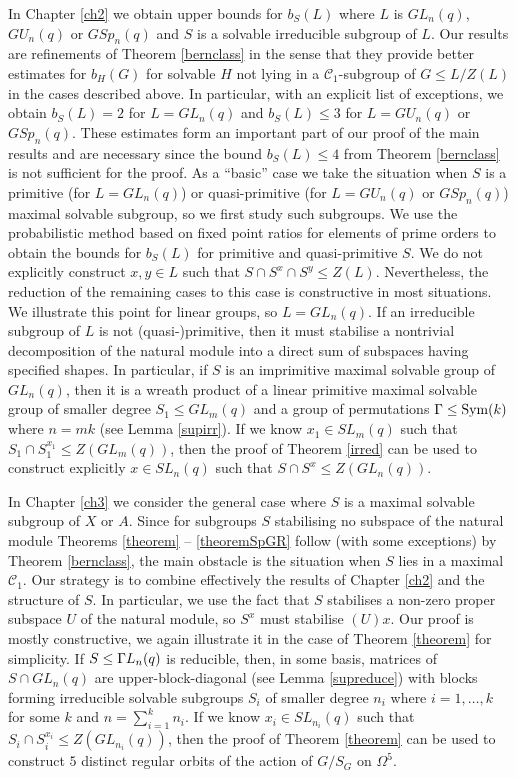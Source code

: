  In Chapter \ref{ch2} we obtain upper bounds for $b_S(L)$ where $L$ is $GL_n(q)$, $GU_n(q)$ or $GSp_n(q)$ and $S$ is a solvable irreducible subgroup of $L.$ Our results  are refinements of Theorem \ref{bernclass} in the sense that they provide better estimates for $b_H(G)$  for solvable $H$ not lying in a $\mathcal{C}_1$-subgroup of $G \le L/Z(L)$ in the cases described above. 
 In particular, with an explicit list of exceptions, we obtain $b_S(L) =2$ for $L=GL_n(q)$ and $b_S(L) \le 3$ for $L=GU_n(q)$ or $GSp_n(q).$  
 These estimates form an important part of our proof of the main results and are necessary since the bound $b_S(L) \le 4$  from Theorem \ref{bernclass} is not sufficient for the proof. As a ``basic'' case we take the situation when $S$ is a primitive (for $L=GL_n(q)$) or quasi-primitive (for $L=GU_n(q)$ or $GSp_n(q)$) maximal solvable subgroup, so we first study such subgroups. We use the probabilistic method based on fixed point ratios for elements of prime orders to obtain the bounds for $b_S(L)$  for primitive and quasi-primitive $S.$ We do not explicitly  construct  $x,y \in L$ such that $S \cap S^x \cap S^y \le Z(L).$ Nevertheless, the reduction of the remaining cases to this case is constructive in most situations. We illustrate this point for linear groups, so $L=GL_n(q).$ If an irreducible subgroup of $L$ is not (quasi-)primitive, then it must stabilise a nontrivial decomposition of the natural module into a direct sum of subspaces having specified shapes.   In particular, if $S$ is an imprimitive maximal solvable group of $GL_n(q)$, then it is a wreath product of a linear primitive maximal solvable group of smaller degree $S_1 \le GL_m(q)$ and a group of permutations $\Gamma \le \mathrm{Sym}(k)$ where $n=mk$ (see Lemma \ref{supirr}).  If we know $x_1 \in SL_m(q)$ such that $S_1 \cap S_1^{x_1} \le Z(GL_m(q))$, then the proof of Theorem   \ref{irred} can be used to construct explicitly   $x \in SL_n(q)$ such that $S \cap S^x \le Z(GL_n(q)).$


  In Chapter \ref{ch3} we consider the general case  where $S$ is a maximal solvable subgroup of $X$ or $A$. Since for subgroups $S$ stabilising no subspace of the natural module Theorems \ref{theorem} -- \ref{theoremSpGR} follow (with some exceptions) by Theorem \ref{bernclass}, the main obstacle is the situation when $S$ lies in a maximal $\mathcal{C}_1$.   Our strategy is to combine effectively the results of Chapter \ref{ch2} and the structure of $S$. In particular, we use the fact that $S$ stabilises a non-zero proper subspace $U$ of the natural module, so $S^x$ must stabilise $(U)x.$ %
  Our proof  is mostly constructive, we again illustrate it in the case of Theorem \ref{theorem} for simplicity.  If $S\le {{\Gamma L}}_n(q)$ is reducible, then, in some basis, matrices of $S\cap GL_n(q)$ are upper-block-diagonal (see Lemma \ref{supreduce}) with blocks forming irreducible solvable subgroups $S_i$ of smaller degree $n_i$ where $i=1, \ldots, k$ for some $k$ and $n=\sum_{i=1}^k n_i.$ If we know  $x_i \in SL_{n_i}(q)$ such that $S_i \cap S_i^{x_i} \le Z(GL_{n_i}(q))$, then the proof of Theorem \ref{theorem} can be used to construct $5$ distinct regular orbits of the action of $G/S_G$ on $\Omega^5.$ 

